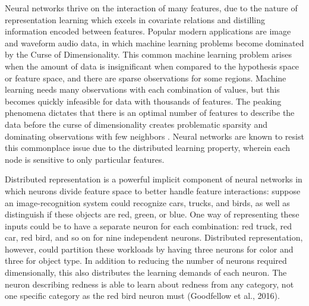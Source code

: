 \documentclass[12pt,twoside]{reedthesis}
\begin{document}
Neural networks thrive on the interaction of many features, due to the
nature of representation learning which excels in covariate relations
and distilling information encoded between features. Popular modern
applications are image and waveform audio data, in which machine
learning problems become dominated by the Curse of Dimensionality. This
common machine learning problem arises when the amount of data is
insignificant when compared to the hypothesis space or feature space,
and there are sparse observations for some regions. Machine learning
needs many observations with each combination of values, but this
becomes quickly infeasible for data with thousands of features. The
peaking phenomena dictates that there is an optimal number of features
to describe the data before the curse of dimensionality creates
problematic sparsity and dominating observations with few neighbors .
Neural networks are known to resist this commonplace issue due to the
distributed learning property, wherein each node is sensitive to only
particular features.

Distributed representation is a powerful implicit component of neural
networks in which neurons divide feature space to better handle feature
interactions: suppose an image-recognition system could recognize cars,
trucks, and birds, as well as distinguish if these objects are red,
green, or blue. One way of representing these inputs could be to have a
separate neuron for each combination: red truck, red car, red bird, and
so on for nine independent neurons. Distributed representation, however,
could partition these workloads by having three neurons for color and
three for object type. In addition to reducing the number of neurons
required dimensionally, this also distributes the learning demands of
each neuron. The neuron describing redness is able to learn about
redness from any category, not one specific category as the red bird
neuron must (Goodfellow et al., 2016).
\end{document}
